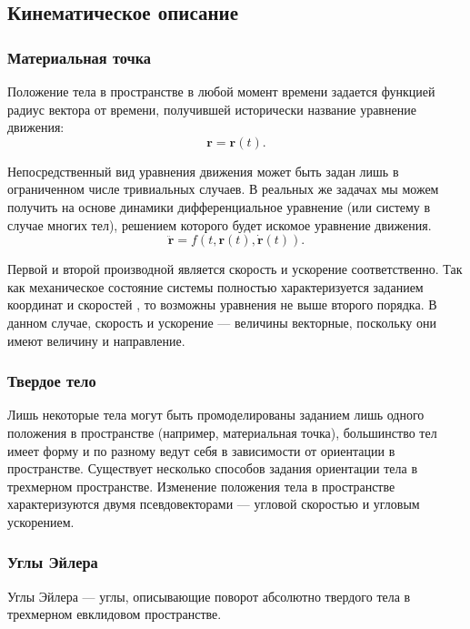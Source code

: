 \subsection{Кинематическое описание}
\subsubsection{Материальная точка}
Положение тела в пространстве в любой момент времени задается функцией радиус вектора от
времени, получившей исторически название уравнение движения:
\begin{equation}
 \mathbf{r}=\mathbf{r}(t).
\end{equation}

Непосредственный вид уравнения движения может быть задан лишь в ограниченном числе 
тривиальных случаев. В реальных же задачах мы можем получить на основе динамики 
дифференциальное уравнение (или систему в случае многих тел), решением которого
будет искомое уравнение движения.
\begin{equation}
 \ddot{\mathbf{r}}=f(t, \mathbf{r}(t), \dot{\mathbf{r}}(t)).
\end{equation}

Первой и второй производной является скорость и ускорение соответственно.
Так как механическое состояние системы полностью характеризуется заданием координат
и скоростей \cite[10]{Landau1}, то возможны уравнения не выше второго порядка. 
В данном случае, скорость и ускорение --- величины векторные, поскольку они имеют величину и направление.

\subsubsection{Твердое тело}
Лишь некоторые тела могут быть промоделированы заданием лишь одного положения в пространстве 
(например, материальная точка), большинство тел имеет форму и по разному ведут себя в зависимости
от ориентации в пространстве. Существует несколько способов задания ориентации тела в трехмерном
пространстве. Изменение положения тела в пространстве характеризуются двумя псевдовекторами ---
угловой скоростью и угловым ускорением.
\subsubsection{Углы Эйлера}
Углы Эйлера --- углы, описывающие поворот абсолютно твердого тела в трехмерном евклидовом пространстве.

